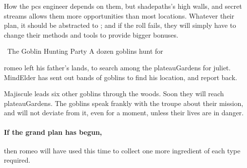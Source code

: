 How the \glspl{pc} engineer  depends on them, but \gls{shadepaths}'s high walls, and secret streams allows them more opportunities than most locations.
Whatever their plan, it should be abstracted to ; and if the roll fails, they will simply have to change their methods and tools to provide bigger bonuses.

{\squash~The Goblin Hunting Party}%
{A dozen goblins hunt for }%

\Gls{romeo} left his father's lands, to search among the \gls{plateauGardens} for \gls{juliet}.
\Gls{MindElder} has sent out bands of goblins to find his location, and report back.

Majiscule leads six other goblins through the woods.
Soon they will reach \gls{plateauGardens}.
The goblins speak frankly with the troupe about their mission, and will not deviate from it, even for a moment, unless their lives are in danger.

\paragraph{If the grand plan has begun,}
then \gls{romeo} will have used this time to collect one more \gls{ingredient} of each type required.

